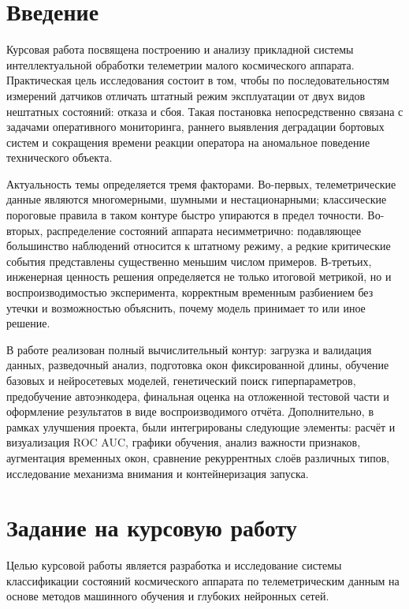 \documentclass[14pt,a4paper]{extarticle}
\begin{document}
\section{Введение}
Курсовая работа посвящена построению и анализу прикладной системы интеллектуальной обработки телеметрии малого космического аппарата. Практическая цель исследования состоит в том, чтобы по последовательностям измерений датчиков отличать штатный режим эксплуатации от двух видов нештатных состояний: отказа и сбоя. Такая постановка непосредственно связана с задачами оперативного мониторинга, раннего выявления деградации бортовых систем и сокращения времени реакции оператора на аномальное поведение технического объекта.

Актуальность темы определяется тремя факторами. Во-первых, телеметрические данные являются многомерными, шумными и нестационарными; классические пороговые правила в таком контуре быстро упираются в предел точности. Во-вторых, распределение состояний аппарата несимметрично: подавляющее большинство наблюдений относится к штатному режиму, а редкие критические события представлены существенно меньшим числом примеров. В-третьих, инженерная ценность решения определяется не только итоговой метрикой, но и воспроизводимостью эксперимента, корректным временным разбиением без утечки и возможностью объяснить, почему модель принимает то или иное решение.

В работе реализован полный вычислительный контур: загрузка и валидация данных, разведочный анализ, подготовка окон фиксированной длины, обучение базовых и нейросетевых моделей, генетический поиск гиперпараметров, предобучение автоэнкодера, финальная оценка на отложенной тестовой части и оформление результатов в виде воспроизводимого отчёта. Дополнительно, в рамках улучшения проекта, были интегрированы следующие элементы: расчёт и визуализация ROC AUC, графики обучения, анализ важности признаков, аугментация временных окон, сравнение рекуррентных слоёв различных типов, исследование механизма внимания и контейнеризация запуска.

\section{Задание на курсовую работу}
Целью курсовой работы является разработка и исследование системы классификации состояний космического аппарата по телеметрическим данным на основе методов машинного обучения и глубоких нейронных сетей.
\end{document}
